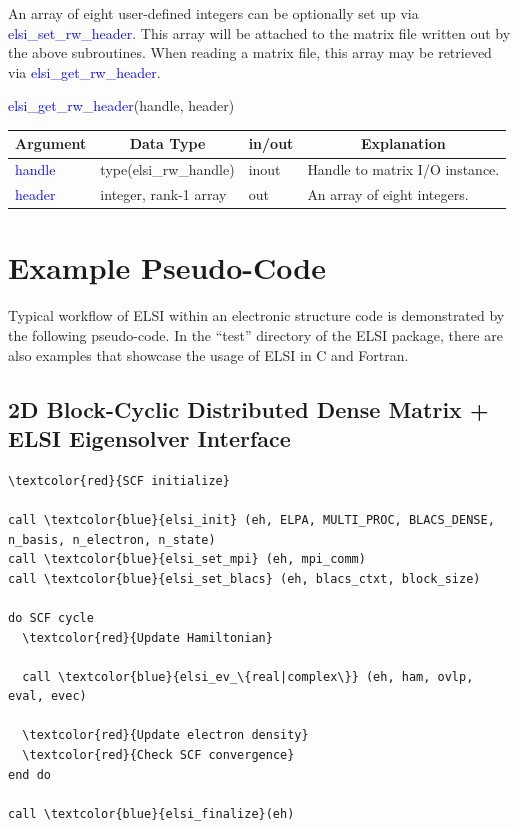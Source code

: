 \documentclass{report}
\begin{document}
An array of eight user-defined integers can be optionally set up via \textcolor{blue}{elsi\_set\_rw\_header}. This array will be attached to the matrix file written out by the above subroutines. When reading a matrix file, this array may be retrieved via \textcolor{blue}{elsi\_get\_rw\_header}.
\begin{labeling}{\hspace{6cm}}
\item [\hspace{0.3cm} \textcolor{blue}{elsi\_get\_rw\_header}(handle, header)]
\end{labeling}

\begin{tabular}[]{|p{20mm}|p{45mm}|p{15mm}|p{85mm}|}
\hline
\multicolumn{1}{|c|}{\textbf{Argument}} & \multicolumn{1}{c|}{\textbf{Data Type}} & \multicolumn{1}{c|}{\textbf{in/out}} & \multicolumn{1}{c|}{\textbf{Explanation}}\\
\hline
\textcolor{blue}{handle} & type(elsi\_rw\_handle) & inout & Handle to matrix I/O instance.\\
\hline
\textcolor{blue}{header} & integer, rank-1 array  & out   & An array of eight integers.\\
\hline
\end{tabular}

\section{Example Pseudo-Code}
\label{sec:example}
Typical workflow of ELSI within an electronic structure code is demonstrated by the following pseudo-code. In the ``test'' directory of the ELSI package, there are also examples that showcase the usage of ELSI in C and Fortran.

\subsection*{2D Block-Cyclic Distributed Dense Matrix + ELSI Eigensolver Interface}
\begin{tcolorbox}
\begin{Verbatim}[commandchars=\\\{\}]
\textcolor{red}{SCF initialize}

call \textcolor{blue}{elsi_init} (eh, ELPA, MULTI_PROC, BLACS_DENSE, n_basis, n_electron, n_state)
call \textcolor{blue}{elsi_set_mpi} (eh, mpi_comm)
call \textcolor{blue}{elsi_set_blacs} (eh, blacs_ctxt, block_size)

do SCF cycle
  \textcolor{red}{Update Hamiltonian}

  call \textcolor{blue}{elsi_ev_\{real|complex\}} (eh, ham, ovlp, eval, evec)

  \textcolor{red}{Update electron density}
  \textcolor{red}{Check SCF convergence}
end do

call \textcolor{blue}{elsi_finalize}(eh)
\end{Verbatim}
\end{tcolorbox}
\end{document}
